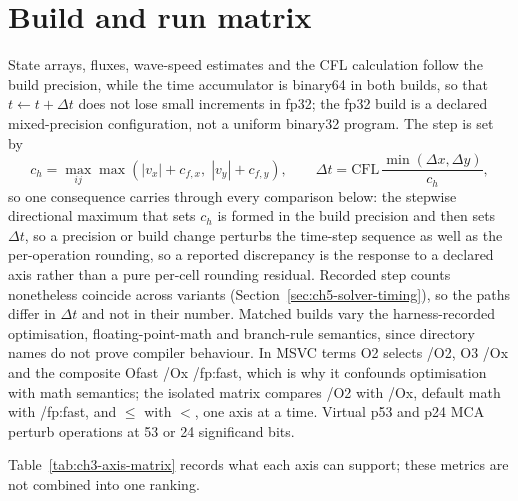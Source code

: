 \section{Build and run matrix}

State arrays, fluxes, wave-speed estimates and the CFL calculation follow the
build precision, while the time accumulator is binary64 in both builds, so that
$t \leftarrow t+\Delta t$ does not lose small increments in fp32; the fp32
build is a declared mixed-precision configuration, not a uniform binary32
program. The step is set by
\begin{equation}
 c_h=\max_{ij}\max\!\left(|v_x|+c_{f,x},\;|v_y|+c_{f,y}\right),\qquad
 \Delta t=\mathrm{CFL}\,\frac{\min(\Delta x,\Delta y)}{c_h},
 \label{eq:ch3-cfl}
\end{equation}
so one consequence carries through every comparison below: the stepwise
directional maximum that sets $c_h$ is formed in the build precision and then
sets $\Delta t$, so a precision or build change perturbs the time-step sequence
as well as the per-operation rounding, so a reported discrepancy is the response
to a declared axis rather than a pure per-cell rounding residual. Recorded step
counts nonetheless coincide across variants
(Section~\ref{sec:ch5-solver-timing}), so the paths differ in $\Delta t$ and not
in their number. Matched builds vary the harness-recorded optimisation,
floating-point-math and branch-rule semantics, since directory names do not
prove compiler behaviour. In MSVC terms O2 selects /O2, O3 /Ox and the composite
Ofast /Ox /fp:fast, which is why it confounds optimisation with math semantics;
the isolated matrix compares /O2 with /Ox, default math with /fp:fast, and
$\leq$ with $<$, one axis at a time. Virtual p53 and p24 MCA
perturb operations at 53 or 24 significand bits.

Table~\ref{tab:ch3-axis-matrix} records what each axis can support; these
metrics are not combined into one ranking.

